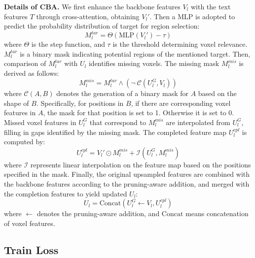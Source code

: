 \textbf{Details of CBA.} We first enhance the backbone features $V_l$ with the text features $T$ through cross-attention, obtaining $V_l'$. Then a MLP is adopted to predict the probability distribution of target for region selection:
\begin{equation}
    M_l^{tar} = \Theta(\text{MLP}(V_l') - \tau)
\end{equation}
where \( \Theta \) is the step function, and \( \tau \) is the threshold determining voxel relevance. $M_l^{tar}$ is a binary mask indicating potential regions of the mentioned target.
Then, comparison of $M_l^{tar}$ with $U_l$ identifies missing voxels. The missing mask $M_l^{mis}$ is derived as follows:
\begin{equation}
    M_l^{mis}=M_l^{tar} \land (\neg \ \mathcal{C}(U_l^G,V_l))
\end{equation}
where \(\mathcal{C}(A,B)\) denotes the generation of a binary mask for \(A\) based on the shape of \(B\). Specifically, for positions in \(B\), if there are corresponding voxel features in \(A\), the mask for that position is set to 1. Otherwise it is set to 0.
Missed voxel features in $U_l^G$ that correspond to $M_l^{mis}$ are interpolated from $U_l^G$, filling in gaps identified by the missing mask. The completed feature map $U_l^{cpl}$ is computed by:
\begin{equation}
    U_l^{cpl}=V_l' \odot M_l^{mis} + \mathcal{I}(U_l^G, M_l^{mis})
\end{equation}
where \(\mathcal{I}\) represents linear interpolation on the feature map based on the positions specified in the mask.
Finally, the original upsampled features are combined with the backbone features according to the pruning-aware addition, and merged with the completion features to yield updated $U_l$:
\begin{equation}
    U_l=\text{Concat}(U^G_l \leftarrow V_l, U_l^{cpl})
\end{equation}
where \( \leftarrow \) denotes the pruning-aware addition, and \(\text{Concat}\) means concatenation of voxel features.




\subsection{Train Loss}\label{sec:3.4}

